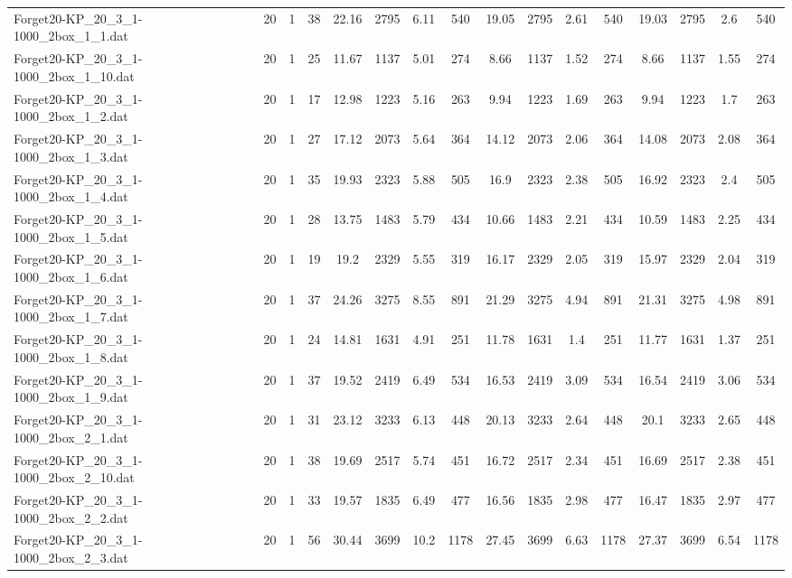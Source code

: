 \begin{sidewaystable}[!ht]
{\begin{tabular}{lccccccccccccccc}
Forget20-KP\_20\_3\_1-1000\_2box\_1\_1.dat & 20 & 1 & 38 & 22.16 & 2795 & 6.11 & 540 & 19.05 & 2795 & 2.61 & 540 & 19.03 & 2795 & 2.6 & 540 \\
Forget20-KP\_20\_3\_1-1000\_2box\_1\_10.dat & 20 & 1 & 25 & 11.67 & 1137 & 5.01 & 274 & 8.66 & 1137 & 1.52 & 274 & 8.66 & 1137 & 1.55 & 274 \\
Forget20-KP\_20\_3\_1-1000\_2box\_1\_2.dat & 20 & 1 & 17 & 12.98 & 1223 & 5.16 & 263 & 9.94 & 1223 & 1.69 & 263 & 9.94 & 1223 & 1.7 & 263 \\
Forget20-KP\_20\_3\_1-1000\_2box\_1\_3.dat & 20 & 1 & 27 & 17.12 & 2073 & 5.64 & 364 & 14.12 & 2073 & 2.06 & 364 & 14.08 & 2073 & 2.08 & 364 \\
Forget20-KP\_20\_3\_1-1000\_2box\_1\_4.dat & 20 & 1 & 35 & 19.93 & 2323 & 5.88 & 505 & 16.9 & 2323 & 2.38 & 505 & 16.92 & 2323 & 2.4 & 505 \\
Forget20-KP\_20\_3\_1-1000\_2box\_1\_5.dat & 20 & 1 & 28 & 13.75 & 1483 & 5.79 & 434 & 10.66 & 1483 & 2.21 & 434 & 10.59 & 1483 & 2.25 & 434 \\
Forget20-KP\_20\_3\_1-1000\_2box\_1\_6.dat & 20 & 1 & 19 & 19.2 & 2329 & 5.55 & 319 & 16.17 & 2329 & 2.05 & 319 & 15.97 & 2329 & 2.04 & 319 \\
Forget20-KP\_20\_3\_1-1000\_2box\_1\_7.dat & 20 & 1 & 37 & 24.26 & 3275 & 8.55 & 891 & 21.29 & 3275 & 4.94 & 891 & 21.31 & 3275 & 4.98 & 891 \\
Forget20-KP\_20\_3\_1-1000\_2box\_1\_8.dat & 20 & 1 & 24 & 14.81 & 1631 & 4.91 & 251 & 11.78 & 1631 & 1.4 & 251 & 11.77 & 1631 &  \textcolor{blue2}{1.37} & 251 \\
Forget20-KP\_20\_3\_1-1000\_2box\_1\_9.dat & 20 & 1 & 37 & 19.52 & 2419 & 6.49 & 534 & 16.53 & 2419 & 3.09 & 534 & 16.54 & 2419 & 3.06 & 534 \\
Forget20-KP\_20\_3\_1-1000\_2box\_2\_1.dat & 20 & 1 & 31 & 23.12 & 3233 & 6.13 & 448 & 20.13 & 3233 & 2.64 & 448 & 20.1 & 3233 & 2.65 & 448 \\
Forget20-KP\_20\_3\_1-1000\_2box\_2\_10.dat & 20 & 1 & 38 & 19.69 & 2517 & 5.74 & 451 & 16.72 & 2517 & 2.34 & 451 & 16.69 & 2517 & 2.38 & 451 \\
Forget20-KP\_20\_3\_1-1000\_2box\_2\_2.dat & 20 & 1 & 33 & 19.57 & 1835 & 6.49 & 477 & 16.56 & 1835 & 2.98 & 477 & 16.47 & 1835 &  \textcolor{blue2}{2.97} & 477 \\
Forget20-KP\_20\_3\_1-1000\_2box\_2\_3.dat & 20 & 1 & 56 & 30.44 & 3699 & 10.2 & 1178 & 27.45 & 3699 & 6.63 & 1178 & 27.37 & 3699 &  \textcolor{blue2}{6.54} & 1178 \\

\end{tabular}}
\end{sidewaystable}
